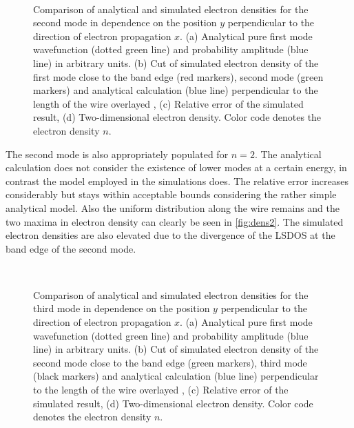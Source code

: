 \begin{figure}[h]
  \begin{center}
 \qquad
    \\
    \qquad
    \caption{Comparison of analytical and simulated electron densities for the second mode in dependence on the position $y$ perpendicular to the direction of electron propagation $x$. (a) Analytical pure first mode wavefunction (dotted green line) and probability amplitude (blue line) in arbitrary units. (b) Cut of simulated electron density of the first mode close to the band edge (red markers), second mode (green markers) and analytical calculation (blue line) perpendicular to the length of the wire overlayed , (c) Relative error of the simulated result, (d) Two-dimensional electron density. Color code denotes the electron density $n$.}\label{fig:mode2}
  \end{center}
\end{figure}
The second mode is also appropriately populated for $n=2$. The analytical calculation does not consider the existence of lower modes at a certain energy, in contrast the model employed in the simulations does. The relative error increases considerably but stays within acceptable bounds considering the rather simple analytical model.
Also the uniform distribution along the wire remains and the two maxima in electron density can clearly be seen in \cref{fig:dens2}. The simulated electron densities are also elevated due to the divergence of the LSDOS at the band edge of the second mode.\par
\begin{figure}[h]
  \begin{center}
 \qquad
    \\
    \qquad
    \caption{Comparison of analytical and simulated electron densities for the third mode in dependence on the position $y$ perpendicular to the direction of electron propagation $x$. (a) Analytical pure first mode wavefunction (dotted green line) and probability amplitude (blue line) in arbitrary units. (b) Cut of simulated electron density of the second mode close to the band edge (green markers), third mode (black markers) and analytical calculation (blue line) perpendicular to the length of the wire overlayed , (c) Relative error of the simulated result, (d) Two-dimensional electron density. Color code denotes the electron density $n$.}\label{fig:mode3}
  \end{center}
\end{figure}
